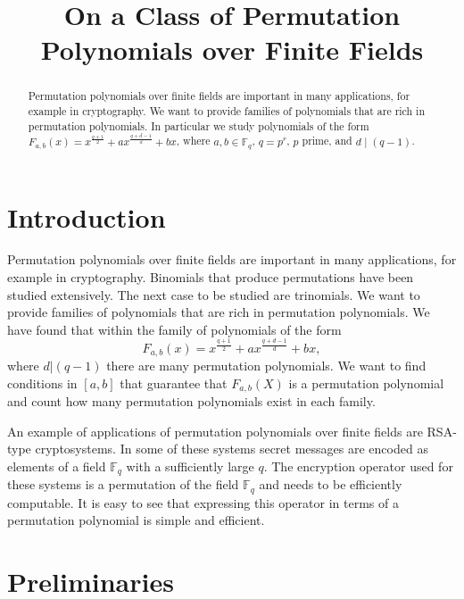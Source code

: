 \documentclass{article}
\theoremstyle{definition}
\theoremstyle{remark}
\numberwithin{equation}{section}
\begin{document}
\title{On a Class of Permutation Polynomials over Finite Fields}


\maketitle

\begin{abstract}
Permutation polynomials over finite fields are important in many applications, for example in cryptography. We want to provide families of polynomials that are rich in permutation polynomials. In particular we study polynomials of the form $F_{a,b}(x) = x^{\frac{q+1}{2}} + a x^{\frac{q+d-1}{d}} + b x$, where $a,b \in \mathbb{F}_{q}$, $q=p^r$, $p$ prime, and $d \mid (q-1)$.
\end{abstract}


\section{Introduction}

Permutation polynomials over finite fields are important in many applications, for example in cryptography. Binomials that produce permutations have been studied extensively. The next case to be studied are trinomials. We want to provide families of polynomials that are rich in permutation polynomials. We have found that within the family of polynomials of the form $$F_{a,b}(x) = x^{\frac{q+1}{2}} + a x^{\frac{q+d-1}{d}} + b x,$$ where $d | (q-1)$  there are many permutation polynomials. We want to find conditions in $[a,b]$ that guarantee that $F_{a,b}(X)$ is a permutation polynomial and count how many permutation polynomials exist in each family.

An example of applications of permutation polynomials over finite fields are RSA-type cryptosystems. In some of these systems secret messages are encoded as elements of a field $\mathbb{F}_{q}$ with a sufficiently large $q$. The encryption operator used for these systems is a permutation of the field $\mathbb{F}_{q}$ and needs to be efficiently computable. It is easy to see that expressing this operator in terms of a permutation polynomial is simple and efficient.

\section{Preliminaries}
\end{document}
